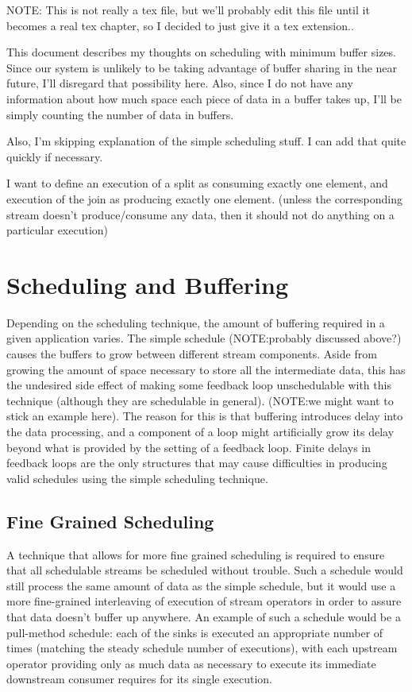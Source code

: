 NOTE: This is not really a tex file, but we'll probably edit this file until 
it becomes a real tex chapter, so I decided to just give it a tex extension..

This document describes my thoughts on scheduling with minimum buffer sizes.
Since our system is unlikely to be taking advantage of buffer sharing in the 
near future, I'll disregard that possibility here.  Also, since I do not have 
any information about how much space each piece of data in a buffer takes up, 
I'll be simply counting the number of data in buffers.

Also, I'm skipping explanation of the simple scheduling stuff.  I can add that
quite quickly if necessary.

I want to define an execution of a split as consuming exactly one element, and
execution of the join as producing exactly one element. (unless the
corresponding stream doesn't produce/consume any data, then it should not
do anything on a particular execution)

\section{Scheduling and Buffering}

Depending on the scheduling technique, the amount of buffering required in a 
given application varies.  The simple schedule (NOTE:probably discussed above?) 
causes the buffers to grow between different stream components.  Aside from
growing the amount of space necessary to store all the intermediate data,
this has the undesired side effect of making some feedback loop unschedulable
with this technique (although they are schedulable in general).  (NOTE:we might
want to stick an example here).  The reason for this is that buffering
introduces delay into the data processing, and a component of a loop might
artificially grow its delay beyond what is provided by the \delay setting of 
a feedback loop.  Finite delays in feedback loops are the only structures
that may cause difficulties in producing valid schedules using the simple
scheduling technique.

\subsection{Fine Grained Scheduling}

A technique that allows for more fine grained scheduling is required to
ensure that all schedulable streams be scheduled without trouble.  Such a
schedule would still process the same amount of data as the simple schedule,
but it would use a more fine-grained interleaving of execution of stream
operators in order to assure that data doesn't buffer up anywhere.
An example of such a schedule would be a pull-method schedule: each of the
sinks is executed an appropriate number of times (matching the steady schedule
number of executions), with each upstream operator providing only as much 
data as necessary to execute its immediate downstream consumer requires 
for its single execution.

